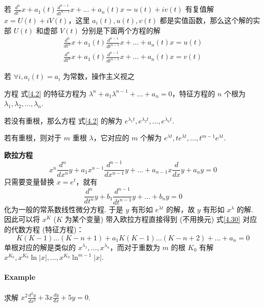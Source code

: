 若 $\displaystyle \frac{d^{n}}{dt^{n}}x+a_{1}(t)\frac{d^{n-1}}{dt^{n-1}}x+\dots+a_{n}(t)x=u(t)+iv(t)$ 有复值解 $\displaystyle x=U(t)+iV(t)$，这里 $\displaystyle a_{i}(t),u(t),v(t)$ 都是实值函数，那么这个解的实部 $\displaystyle U(t)$ 和虚部 $\displaystyle V(t)$ 分别是下面两个方程的解
\begin{gather}
    \frac{d^{n}}{dt^{n}}x+a_{1}(t)\frac{d^{n-1}}{dt^{n-1}}x+\dots+a_{n}(t)x=u(t) \\
    \frac{d^{n}}{dt^{n}}x+a_{1}(t)\frac{d^{n-1}}{dt^{n-1}}x+\dots+a_{n}(t)x=v(t)
\end{gather}
\begin{note}
    若 $\displaystyle \forall i,a_{i}(t)=a_{i}$ 为常数，操作主义视之
\end{note}
方程 式\ref{4.2} 的特征方程为 $\displaystyle \lambda^{n}+a_{1}\lambda^{n-1}+\dots+a_{n}=0$，特征方程的 $n$ 个根为 $\displaystyle \lambda_{1},\lambda_{2},\dots,\lambda _{n}$.

若没有重根，那么方程 式\ref{4.2} 的解为 $\displaystyle e^{ \lambda_{1}t },e^{ \lambda_{2}t },\dots,e^{ \lambda _{n}t }$.

若有重根，则对于 $m$ 重根 $\displaystyle \lambda$，它对应的 $m$ 个解为 $\displaystyle e^{ \lambda t },t e^{ \lambda t },\dots,t^{m-1}e^{ \lambda t }$.

\textbf{欧拉方程}
$$
    x^{n}\frac{d^{n}}{dx^{n}}y+a_{1}x^{n-1}\frac{d^{n-1}}{dx^{n-1}}y+\dots+a_{n-1}x\frac{d}{dx}y+a_{n}y=0
$$
只需要变量替换 $\displaystyle x=e^{ t }$，就有
\begin{equation}\label{4.30}
    \displaystyle \frac{d^{n}}{dt^{n}}y+b_{1}\frac{d^{n-1}}{dt^{n-1}}y+\dots+b_{n}y=0
\end{equation}
化为一般的常系数线性微分方程. 于是 $\displaystyle y$ 有形如 $\displaystyle e^{ \lambda t }$ 的解，故 $\displaystyle y$ 有形如 $\displaystyle x^{\lambda}$ 的解. 因此可以将 $\displaystyle x^{K}$ ($K$ 为某个变量) 带入欧拉方程直接得到 (不用换元) 式\ref{4.30} 对应的代数方程 (特征方程)：
$$
    K(K-1)\dots(K-n+1)+a_{1}K(K-1)\dots(K-n+2)+\dots+a_{n}=0
$$
单根对应的解是类似的 $\displaystyle x^{\lambda_{1}},\dots,x^{\lambda _{n}}$，而对于重数为 $m$ 的根 $\displaystyle K_{0}$ 有解 $\displaystyle x^{K_{0}},x^{K_{0}}\ln \lvert x \rvert,\dots,x^{K_{0}}\ln ^{m-1}\lvert x \rvert$.

\paragraph{Example}

求解 $\displaystyle x^{2}\frac{d^{2}y}{dx^{2}}+3x\frac{dy}{dx}+5y=0$.

